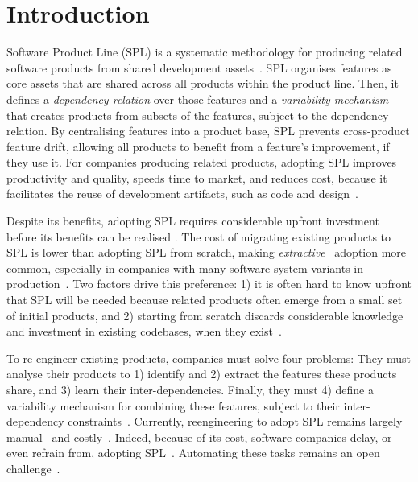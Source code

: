 \section{Introduction}
\label{sec:introduction}

Software Product Line (SPL) is a systematic methodology for producing related software products from shared development assets~\cite{Pohl2005, Linden2007, Fischer2015}. SPL organises features as core assets that are shared across all products within the product line. Then, it defines a \emph{dependency relation} over those features and a \emph{variability mechanism} that creates products from subsets of the features, subject to the dependency relation. By centralising features into a product base, SPL prevents cross-product feature drift, allowing all products to benefit from a feature's improvement, if they use it.
For companies producing related products, adopting SPL improves productivity and quality, speeds time to market, and reduces cost, because it facilitates the reuse of development artifacts, such as code and design~\cite{Linden2007,Bastos2015}.

Despite its benefits, adopting SPL requires considerable upfront investment before its benefits can be realised \cite{Breivold2008, Bastos2017, Daniel2020}. The cost of migrating existing products to SPL is lower than adopting SPL from scratch, making \emph{extractive}~\cite{Krueger2001} adoption more common, especially in companies with many software system variants in production~\cite{Berger2013}. Two factors drive this preference: 1) it is often hard to know upfront that SPL will be needed because related products often emerge from a small set of initial products, and 2)  starting from scratch discards considerable knowledge and investment in existing codebases, when they exist~\cite{Breivold2008,Northrop2012}.

To re-engineer existing products, companies must solve four problems:  They must analyse their products to 1) identify and 2) extract the features these products share, and 3) learn their inter-dependencies. Finally, they must 4) define a variability mechanism for combining these features, subject to their inter-dependency constraints~\cite{Assuncao2017}. 
Currently, reengineering to adopt SPL remains largely manual~\cite{Assuncao2017} and costly~\cite{Bockle2004}. Indeed, because of its cost, software companies delay, or even refrain from, adopting SPL~\cite{Fischer2015}.  Automating these tasks remains an open challenge~\cite{Assuncao2017}.

